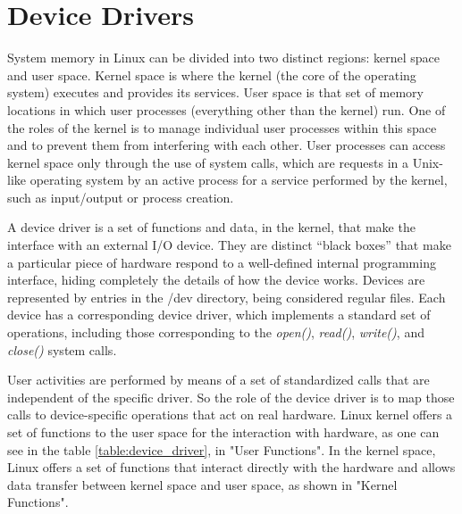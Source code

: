 \clearpage
\section{Device Drivers}
System memory in Linux can be divided into two distinct regions: kernel space and user space. Kernel space is where the kernel (the core of the operating system) executes and provides its services. User space is that set of memory locations in which user processes (everything other than the kernel) run. One of the roles of the kernel is to manage individual user processes within this space and to prevent them from interfering with each other. User processes can access kernel space only through the use of system calls, which are requests in a Unix-like operating system by an active process for a service performed by the kernel, such as input/output or process creation. \cite{kernel_space}

A device driver is a set of functions and data, in the kernel, that make the interface with an external I/O device. They are distinct “black boxes” that make a particular piece of hardware respond to a well-defined internal programming interface, hiding completely the details of how the device works. Devices  are  represented  by  entries  in  the  /dev  directory, being considered regular files.  Each  device  has  a  corresponding device driver, which implements a standard set of operations, including those  corresponding  to  the  \textit{open()},  \textit{read()}, \textit{ write()},  and  \textit{close()}  system  calls. \cite{linux_dev_drivers}

User activities are performed by means of a set of standardized calls that are independent of the specific driver. So the role of the device driver is to map those calls to device-specific operations that act on real hardware. Linux kernel offers a set of functions to the user space for the interaction with hardware, as one can see in the table \ref{table:device_driver}, in "User Functions". In the kernel space, Linux offers a set of functions that interact directly with the hardware and allows data transfer between kernel space and user space, as shown in "Kernel Functions".

